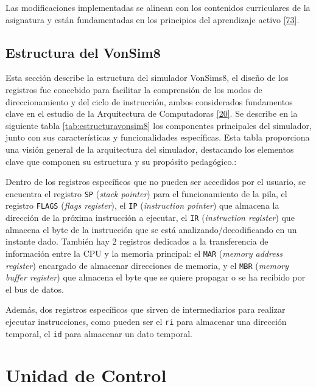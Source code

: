 \documentclass[12pt,oneside]{templates/unerthesis}
\begin{document}
Las modificaciones implementadas se alinean con los contenidos curriculares de la asignatura y están fundamentadas en los principios del aprendizaje activo \protect\hyperlink{ref-bonwell1991active}{{[}73{]}}.

\hypertarget{estructura-del-vonsim8}{%
\subsection{Estructura del VonSim8}\label{estructura-del-vonsim8}}

Esta sección describe la estructura del simulador VonSims8, el diseño de los registros fue concebido para facilitar la comprensión de los modos de direccionamiento y del ciclo de instrucción, ambos considerados fundamentos clave en el estudio de la Arquitectura de Computadoras \protect\hyperlink{ref-stallings_computer_2021}{{[}20{]}}. Se describe en la siguiente tabla \ref{tab:estructuravonsim8} los componentes principales del simulador, junto con sus características y funcionalidades específicas. Esta tabla proporciona una visión general de la arquitectura del simulador, destacando los elementos clave que componen su estructura y su propósito pedagógico.:

Dentro de los registros específicos que no pueden ser accedidos por el usuario, se encuentra el registro \texttt{SP} (\emph{stack pointer}) para el funcionamiento de la pila, el registro \texttt{FLAGS} (\emph{flags register}), el \texttt{IP} (\emph{instruction pointer}) que almacena la dirección de la próxima instrucción a ejecutar, el \texttt{IR} (\emph{instruction register}) que almacena el byte de la instrucción que se está analizando/decodificando en un instante dado. También hay 2 registros dedicados a la transferencia de información entre la CPU y la memoria principal: el \texttt{MAR} (\emph{memory address register}) encargado de almacenar direcciones de memoria, y el \texttt{MBR} (\emph{memory buffer register}) que almacena el byte que se quiere propagar o se ha recibido por el bus de datos.

Además, dos registros específicos que sirven de intermediarios para realizar ejecutar instrucciones, como pueden ser el \texttt{ri} para almacenar una dirección temporal, el \texttt{id} para almacenar un dato temporal.

\hypertarget{unidad-de-control}{%
\section{Unidad de Control}\label{unidad-de-control}}
\end{document}
